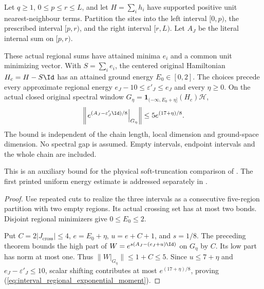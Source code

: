 \begin{lemma}
    \label{thm:interval_regional_exponential_moment}
    \leanok
    Let $q\ge1$, $0\le p\le r\le L$, and let
    $H=\sum_i h_i$ have supported positive unit nearest-neighbour terms.
    Partition the sites into the left interval $[0,p)$, the prescribed
    interval $[p,r)$, and the right interval $[r,L)$. Let $A_J$ be the
    literal internal sum on $[p,r)$.

    These actual regional sums have attained minima $e_i$ and a common
    unit minimizing vector. With $S=\sum_i e_i$, the centered original
    Hamiltonian $H_c=H-S\Id$ has an attained ground energy $E_0\in[0,2]$.
    The choices precede every approximate regional energy
    $e_J-10\le\varepsilon'_J\le e_J$ and every $\eta\ge0$.
    On the actual closed original spectral window
    $G_\eta=\mathbf1_{(-\infty,E_0+\eta]}(H_c)\mathcal H$,
    \begin{align}
        \left\|\left.e^{(A_J-\varepsilon'_J\Id)/8}
        \right|_{G_\eta}\right\|
        \le5e^{(17+\eta)/8}.
        \label{eq:interval_regional_exponential_moment}
    \end{align}
    The bound is independent of the chain length, local dimension and
    ground-space dimension. No spectral gap is assumed. Empty intervals,
    endpoint intervals and the whole chain are included.

    This is an auxiliary bound for the physical soft-truncation comparison
    of \cite{Arad2016RigorousRG}. The first printed uniform energy estimate
    is addressed separately in
    \cite{gap:alvv16_soft_truncation_energy_estimate}.
\end{lemma}
\begin{proof}\leanok
    Use repeated cuts to realize the three intervals as a consecutive
    five-region partition with two empty regions. Its actual crossing
    set has at most two bonds. Disjoint regional minimizers give
    $0\le E_0\le2$.

    Put $C=2|J_{\mathrm{cross}}|\le4$,
    $e=E_0+\eta$, $u=e+C+1$, and $s=1/8$.
    The preceding theorem bounds the high part of
    $W=e^{s(A_J-(e_J+u)\Id)}$ on $G_\eta$ by $C$.
    Its low part has norm at most one. Thus
    $\|W|_{G_\eta}\|\le1+C\le5$.
    Since $u\le7+\eta$ and $e_J-\varepsilon'_J\le10$, scalar shifting
    contributes at most $e^{(17+\eta)/8}$, proving
    (\ref{eq:interval_regional_exponential_moment}).
\end{proof}
